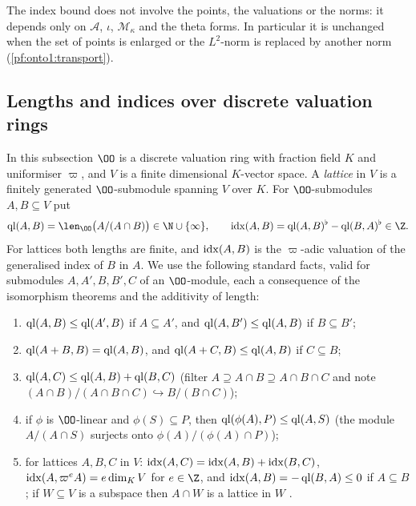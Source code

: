 \begin{remark}\label{pf:onto1:rem-concl}
The index bound does not involve the points, the valuations or the norms: it depends only on $\mathcal A$,
$\iota$, $\mathcal M_\kappa$ and the theta forms. In particular it is unchanged when the set of points is
enlarged or the $L^2$-norm is replaced by another norm (\cref{pf:onto1:transport}).
\end{remark}

\subsection{Lengths and indices over discrete valuation rings}\label{sec:pf:onto1:dvr}

In this subsection $\OO$ is a discrete valuation ring with fraction field $K$ and uniformiser $\varpi$, and $V$
is a finite dimensional $K$-vector space. A \emph{lattice} in $V$ is a finitely generated $\OO$-submodule
spanning $V$ over $K$. For $\OO$-submodules $A,B\subseteq V$ put
\[
\ontooneql(A,B)=\len_{\OO}\bigl(A/(A\cap B)\bigr)\in\N\cup\{\infty\},\qquad
\ontooneidx(A,B)=\ontooneql(A,B)^\flat-\ontooneql(B,A)^\flat\in\Z .
\]
For lattices both lengths are finite, and $\operatorname{idx}(A,B)$ is the $\varpi$-adic valuation of the generalised
index of $B$ in $A$. We use the following standard facts, valid for submodules $A,A',B,B',C$ of an
$\OO$-module, each a consequence of the isomorphism theorems and the additivity of length:
\begin{enumerate}[label=(Q\arabic*)]
\item\label{pf:onto1:Q1} $\operatorname{ql}(A,B)\le\operatorname{ql}(A',B)$ if $A\subseteq A'$, and $\operatorname{ql}(A,B')\le\operatorname{ql}(A,B)$
if $B\subseteq B'$;
\item\label{pf:onto1:Q2} $\operatorname{ql}(A+B,B)=\operatorname{ql}(A,B)$, and $\operatorname{ql}(A+C,B)\le\operatorname{ql}(A,B)$ if
$C\subseteq B$;
\item\label{pf:onto1:Q3} $\operatorname{ql}(A,C)\le\operatorname{ql}(A,B)+\operatorname{ql}(B,C)$ (filter $A\supseteq A\cap B\supseteq
A\cap B\cap C$ and note $(A\cap B)/(A\cap B\cap C)\hookrightarrow B/(B\cap C)$);
\item\label{pf:onto1:Q4} if $\phi$ is $\OO$-linear and $\phi(S)\subseteq P$, then $\operatorname{ql}(\phi(A),P)\le
\operatorname{ql}(A,S)$ (the module $A/(A\cap S)$ surjects onto $\phi(A)/(\phi(A)\cap P)$);
\item\label{pf:onto1:Q5} for lattices $A,B,C$ in $V$: $\operatorname{idx}(A,C)=\operatorname{idx}(A,B)+\operatorname{idx}(B,C)$,
$\operatorname{idx}(A,\varpi^eA)=e\dim_KV$ for $e\in\Z$, and $\operatorname{idx}(A,B)=-\operatorname{ql}(B,A)\le0$ if $A\subseteq B$; if
$W\subseteq V$ is a subspace then $A\cap W$ is a lattice in $W$ \cite[Ch.~III, \S1]{Serre1979}.
\end{enumerate}

